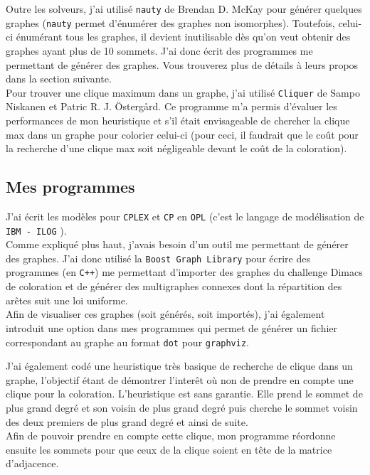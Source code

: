 Outre les solveurs, j'ai utilisé \verb?nauty? \cite{nauty} de Brendan D. McKay pour générer quelques graphes (\verb?nauty?
permet d'énumérer des graphes non isomorphes). Toutefois, celui-ci énumérant tous les graphes, il devient inutilisable
dès qu'on veut obtenir des graphes ayant plus de 10 sommets. J'ai donc écrit des programmes me permettant de
générer des graphes. Vous trouverez plus de détails à leurs propos dans la section suivante.\\

Pour trouver une clique maximum dans un graphe, j'ai utilisé \verb?Cliquer? \cite{cliquer} de
Sampo Niskanen et Patric R. J. Östergård. Ce programme m'a permis d'évaluer les performances
de mon heuristique et s'il était envisageable de chercher la clique max dans un graphe pour
colorier celui-ci (pour ceci, il faudrait que le coût pour la recherche d'une clique max soit
négligeable devant le coût de la coloration).

\subsection{Mes programmes}
J'ai écrit les modèles pour \verb?CPLEX? et \verb?CP? en \verb?OPL? (c'est le langage de modélisation de
\verb?IBM - ILOG? \cite{ibm}).\\

Comme expliqué plus haut, j'avais besoin d'un outil me permettant de générer des graphes.
J'ai donc utilisé la \verb?Boost Graph Library? \cite{bgl} pour écrire des programmes (en \verb?C++?)
me permettant d'importer des graphes du challenge Dimacs \cite{dimacs} de coloration et de générer des multigraphes
connexes dont la répartition des arêtes suit une loi uniforme.\\

Afin de visualiser ces graphes (soit générés, soit importés), j'ai également introduit une option
dans mes programmes qui permet de générer un fichier correspondant au graphe
au format \verb?dot? pour \verb?graphviz?.


J'ai également codé une heuristique très basique de recherche de clique dans un graphe, l'objectif étant
de démontrer l'interêt où non de prendre en compte une clique pour la coloration.
L'heuristique est sans garantie. Elle prend le sommet de plus grand degré et son voisin
de plus grand degré puis cherche le sommet voisin des deux premiers de plus grand degré et ainsi de suite.\\
Afin de pouvoir prendre en compte cette clique, mon programme réordonne ensuite les sommets pour que
ceux de la clique soient en tête de la matrice d'adjacence.\\

